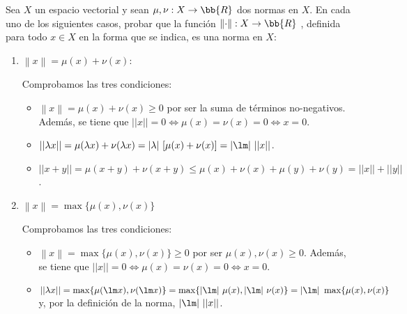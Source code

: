 \begin{ejercicio}
    Sea $X$ un espacio vectorial y sean $\mu , \nu : X \to \bb{R} 
    $ dos normas en $X$. En cada uno de los siguientes casos, probar que la función $\left\lVert \cdot \right\rVert  : X \rightarrow \bb{R}$ , definida para todo $x \in X$ en la forma que se indica, es una norma en $X$:
    \begin{enumerate}
        \item $\left\lVert x \right\rVert = \mu (x) + \nu(x)$:

        Comprobamos las tres condiciones:
        \begin{itemize}
            \item $\left\lVert x \right\rVert = \mu (x) + \nu(x)\geq 0$ por ser la suma de términos no-negativos. Además, se tiene que $||x||=0\Longleftrightarrow \mu(x)=\nu(x)=0\Longleftrightarrow x=0$.

            \item $||\lambda x|| = \mu(\lambda x) + \nu(\lambda x) = |\lambda|~[\mu(x)+\nu(x)] = |\lm|~||x||$.

            \item $||x+y|| = \mu(x+y) + \nu(x+y)\leq \mu(x)+\nu(x) + \mu(y)+\nu(y)=||x|| + ||y||$.
        \end{itemize}
        
        \item $\left\lVert x \right\rVert = \max \{ \mu (x) , \nu(x) \}$

        Comprobamos las tres condiciones:
        \begin{itemize}
            \item $\left\lVert x \right\rVert = \max\{\mu(x),\nu(x)\}\geq 0$ por ser $\mu(x), \nu(x)\geq 0$. Además, se tiene que $||x||=0\Longleftrightarrow \mu(x)=\nu(x)=0\Longleftrightarrow x=0$.

            \item $||\lambda x|| = \max\{\mu(\lm x),\nu(\lm x)\}
            = \max\{|\lm |~\mu(x),|\lm |~\nu(x)\} 
            = |\lm |~\max\{\mu(x),\nu(x)\}$ y, por la definición de la norma, $|\lm|~||x||$.


\end{itemize}
\end{enumerate}
\end{ejercicio}
